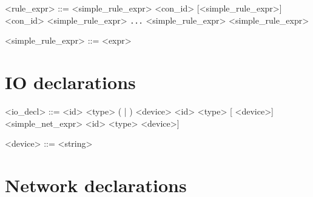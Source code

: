 \begin{grammar}
<rule_expr> ::= <simple_rule_expr>
              \alt <con_id> [<simple_rule_expr>]
              \alt <con_id> \lit{(} <simple_rule_expr> \lit{,} \texttt{...} \lit{,} <simple_rule_expr> \lit{)}
              \alt {}%
              \alt {}%
               \alt {} <simple_rule_expr>%
              \alt \lit{_}                      

<simple_rule_expr> ::= <expr>
\end{grammar}

\section*{IO declarations}

\begin{grammar}
<io_decl> ::=  <id> \lit{:} <type> ( | ) <device>
             \alt {} <id> \lit{:} <type> [ <device>]  <simple_net_expr>
             \alt {} <id> \lit{:} <type>  <device>]

<device> ::= <string>
\end{grammar}

\section*{Network declarations}

